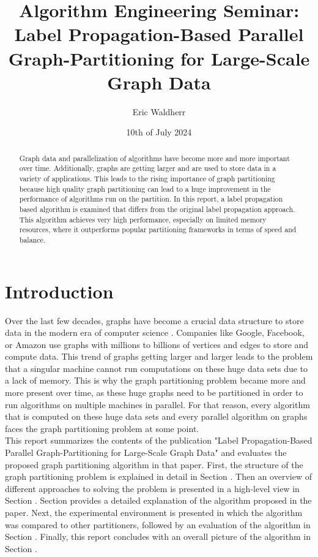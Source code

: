 \documentclass[acmsmall,nonacm,screen,review]{acmart}
\title{Algorithm Engineering Seminar: Label Propagation-Based Parallel Graph-Partitioning for Large-Scale Graph Data}
\author{Eric Waldherr}
\affiliation{%
  \institution{Heidelberg University}
  \streetaddress{Im Neuenheimer Feld 205}
  \city{Heidelberg}
  \state{Baden-Württemberg}
  \country{Germany}
  \postcode{69120}
}
\date{10th of July 2024}
\begin{document}
\begin{abstract}
Graph data and parallelization of algorithms have become more and more important over time. Additionally, graphs are getting larger and are used to store data in a variety of applications. This leads to the rising importance of graph partitioning because high quality graph partitioning can lead to a huge improvement in the performance of algorithms run on the partition. In this report, a label propagation based algorithm is examined that differs from the original label propagation approach. This algorithm achieves very high performance, especially on limited memory resources, where it outperforms popular partitioning frameworks in terms of speed and balance.
\end{abstract}
\maketitle

\section{Introduction}
Over the last few decades, graphs have become a crucial data structure to store data in the modern era of computer science \cite{Junghanns2017}. Companies like Google, Facebook, or Amazon use graphs with millions to billions of vertices and edges to store and compute data. This trend of graphs getting larger and larger leads to the problem that a singular machine cannot run computations on these huge data sets due to a lack of memory. This is why the graph partitioning problem became more and more present over time, as these huge graphs need to be partitioned in order to run algorithms on multiple machines in parallel. For that reason, every algorithm that is computed on these huge data sets and every parallel algorithm on graphs faces the graph partitioning problem at some point. \\
This report summarizes the contents of the publication "Label Propagation-Based Parallel Graph-Partitioning for Large-Scale Graph Data" \cite{Main} and evaluates the proposed graph partitioning algorithm in that paper. First, the structure of the graph partitioning problem is explained in detail in Section . Then an overview of different approaches to solving the problem is presented in a high-level view in Section . Section  provides a detailed explanation of the algorithm proposed in the paper. Next, the experimental environment is presented in which the algorithm was compared to other partitioners, followed by an evaluation of the algorithm in Section . Finally, this report concludes with an overall picture of the algorithm in Section .
\end{document}
